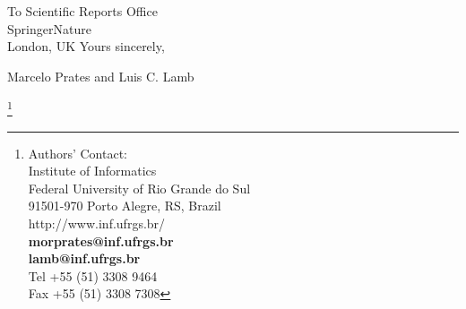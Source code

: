 \documentclass[10pt]{letter} %
\begin{document}
\begin{letter}{To Scientific Reports Office\\
SpringerNature\\
London, UK
 }
Yours sincerely,\\



\begin{flushleft}
Marcelo Prates and Luis C. Lamb
 \end{flushleft}


\let\thefootnote\relax\footnote{Authors' Contact:\\
Institute of Informatics \\
Federal University of Rio Grande do Sul\\ 
91501-970 Porto Alegre, RS, Brazil \\
http://www.inf.ufrgs.br/  \\
\textbf{morprates@inf.ufrgs.br}\\
\textbf{lamb@inf.ufrgs.br}\\
Tel +55 (51) 3308 9464 \\
Fax +55 (51) 3308 7308}



\end{letter}
\end{document}
